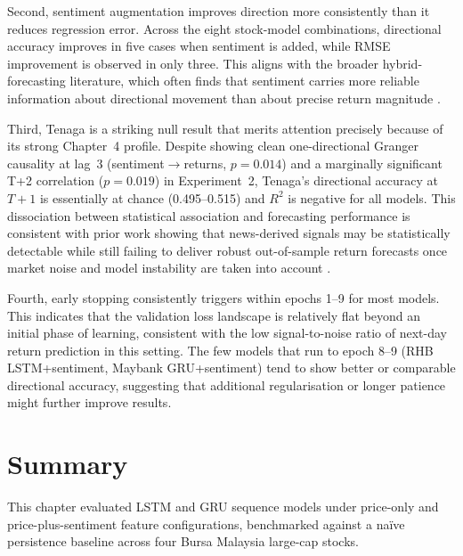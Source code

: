 \documentclass[12pt]{ucetd}
\begin{document}
Second, sentiment augmentation improves direction more consistently than it reduces regression error. Across the eight stock-model combinations, directional accuracy improves in five cases when sentiment is added, while RMSE improvement is observed in only three. This aligns with the broader hybrid-forecasting literature, which often finds that sentiment carries more reliable information about directional movement than about precise return magnitude \cite{ding2015deep, halder2024finbert, soliman2025improving}.

Third, Tenaga is a striking null result that merits attention precisely because of its strong Chapter~4 profile. Despite showing clean one-directional Granger causality at lag~3 (sentiment$\to$returns, $p = 0.014$) and a marginally significant T+2 correlation ($p = 0.019$) in Experiment~2, Tenaga's directional accuracy at $T{+}1$ is essentially at chance (0.495--0.515) and $R^2$ is negative for all models. This dissociation between statistical association and forecasting performance is consistent with prior work showing that news-derived signals may be statistically detectable while still failing to deliver robust out-of-sample return forecasts once market noise and model instability are taken into account \cite{atkins2018financial, davidovic2025news}.

Fourth, early stopping consistently triggers within epochs 1--9 for most models. This indicates that the validation loss landscape is relatively flat beyond an initial phase of learning, consistent with the low signal-to-noise ratio of next-day return prediction in this setting. The few models that run to epoch 8--9 (RHB LSTM+sentiment, Maybank GRU+sentiment) tend to show better or comparable directional accuracy, suggesting that additional regularisation or longer patience might further improve results.

\section{Summary}

This chapter evaluated LSTM and GRU sequence models under price-only and price-plus-sentiment feature configurations, benchmarked against a na\"ive persistence baseline across four Bursa Malaysia large-cap stocks.
\end{document}
